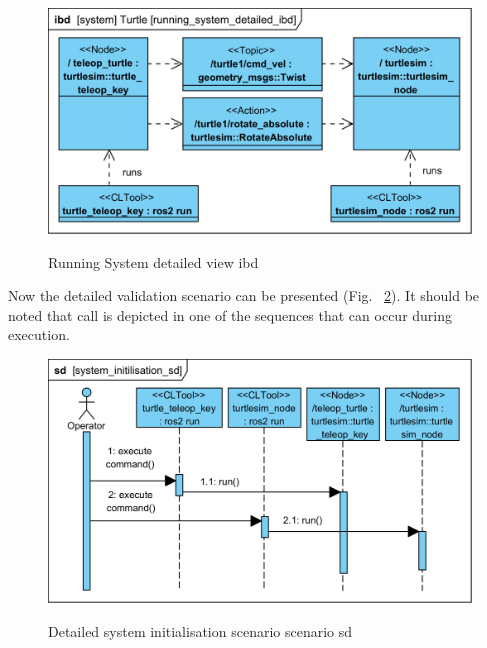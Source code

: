 \documentclass[11pt,oneside,a4paper]{report}
\begin{document}
\begin{figure}[H]
	\centering
	\begin{center}
		{\includegraphics[scale=1.0]{diagrams/running_system_detailed_ibd.png}}
	\end{center}
	\caption{Running System detailed view ibd}
	\label{fig:running_system_detailed_ibd}
\end{figure}

\pagebreak

Now the detailed validation scenario can be presented (Fig.~ \ref{fig:system_initilisation_sd}). It should be noted that \stAction{} call is depicted in one of the sequences that can occur during \stSystem{} execution.
			
\begin{figure}[H]
	\centering
	\begin{center}
		{\includegraphics[scale=1.0]{diagrams/system_initilisation_sd.png}}
	\end{center}
	\caption{Detailed system initialisation scenario scenario sd}
	\label{fig:system_initilisation_sd}
\end{figure}
\end{document}
